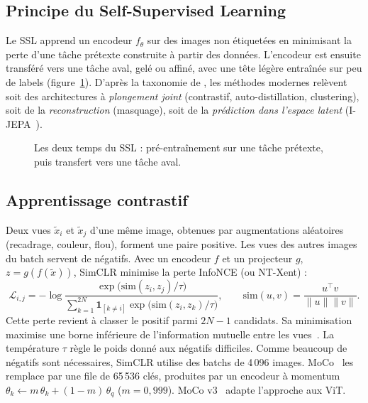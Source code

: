 \documentclass[11pt,a4paper]{article}
\begin{document}
\subsection{Principe du Self-Supervised Learning}
Le SSL apprend un encodeur $f_\theta$ sur des images non étiquetées en minimisant la perte d'une tâche prétexte construite à partir des données. L'encodeur est ensuite transféré vers une tâche aval, gelé ou affiné, avec une tête légère entraînée sur peu de labels (figure~\ref{fig:ssl}). D'après la taxonomie de \citet{balestriero2023cookbook}, les méthodes modernes relèvent soit des architectures à \emph{plongement joint} (contrastif, auto-distillation, clustering), soit de la \emph{reconstruction} (masquage), soit de la \emph{prédiction dans l'espace latent} (I-JEPA~\citep{assran2023ijepa}).

\begin{figure}[ht]
  \centering
  \resizebox{0.8\textwidth}{!}{}
  \caption{Les deux temps du SSL : pré-entraînement sur une tâche prétexte, puis transfert vers une tâche aval.}
  \label{fig:ssl}
\end{figure}

\subsection{Apprentissage contrastif}
Deux vues $\tilde{x}_i$ et $\tilde{x}_j$ d'une même image, obtenues par augmentations aléatoires (recadrage, couleur, flou), forment une paire positive. Les vues des autres images du batch servent de négatifs. Avec un encodeur $f$ et un projecteur $g$, $z = g(f(\tilde{x}))$, SimCLR minimise la perte InfoNCE (ou NT-Xent) :
\begin{equation}
  \mathcal{L}_{i,j} = -\log \frac{\exp\big(\mathrm{sim}(z_i,z_j)/\tau\big)}{\sum_{k=1}^{2N}\mathbf{1}_{[k\neq i]}\exp\big(\mathrm{sim}(z_i,z_k)/\tau\big)},\qquad \mathrm{sim}(u,v)=\frac{u^\top v}{\|u\|\|v\|}.
  \label{eq:infonce}
\end{equation}
Cette perte revient à classer le positif parmi $2N-1$ candidats. Sa minimisation maximise une borne inférieure de l'information mutuelle entre les vues~\citep{oord2018cpc}. La température $\tau$ règle le poids donné aux négatifs difficiles. Comme beaucoup de négatifs sont nécessaires, SimCLR utilise des batchs de 4\,096 images. MoCo~\citep{he2020moco} les remplace par une file de 65\,536 clés, produites par un encodeur à momentum $\theta_k \leftarrow m\,\theta_k + (1-m)\,\theta_q$ ($m=0{,}999$). MoCo v3~\citep{chen2021mocov3} adapte l'approche aux ViT.
\end{document}
